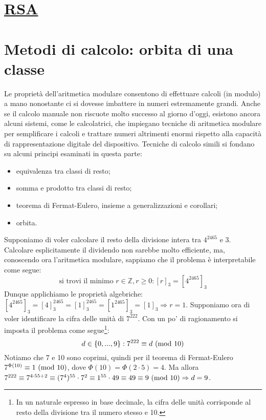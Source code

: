\section{\underline{RSA}}


\section{Metodi di calcolo: orbita di una classe}
Le proprietà dell'aritmetica modulare consentono di effettuare calcoli (in modulo)
a mano nonostante ci si dovesse imbattere in numeri estremamente grandi.
Anche se il calcolo manuale non riscuote molto successo al giorno d'oggi,
esistono ancora alcuni sistemi, come le calcolatrici, che impiegano
tecniche di aritmetica modulare per semplificare i calcoli e trattare
numeri altrimenti enormi rispetto alla capacità di rappresentazione digitale
del dispositivo.
Tecniche di calcolo simili si fondano su alcuni principi esaminati in
questa parte:
\begin{itemize}
\item equivalenza tra classi di resto;
\item somma e prodotto tra classi di resto;
\item teorema di Fermat-Eulero, insieme a generalizzazioni e corollari;
\item orbita.
\end{itemize}
Supponiamo di voler calcolare il resto della divisione intera tra
$4^{2465}$ e $3$. Calcolare esplicitamente il dividendo non sarebbe
molto efficiente, ma, conoscendo ora l'aritmetica modulare, sappiamo
che il problema è interpretabile come segue:
\[ \text{si trovi il minimo } r\in\mathbb{Z},r\geq0: [r]_3 = [4^{2465}]_3 \]
Dunque applichiamo le proprietà algebriche: $[4^{2465}]_3 = [4]^{2465}_3 = [1]_3^{2465} = [1^{2465}]_3 = [1]_3 \Rightarrow r = 1$.
Supponiamo ora di voler identificare la cifra delle unità di $7^{222}$.
Con un po' di ragionamento si imposta il problema come segue\footnote{In un naturale espresso in
base decimale, la cifra delle unità corrisponde al resto della divisione tra il numero stesso e 10.}:
\[ d\in\{0,...,9\}: 7^{222}\equiv d\ (\mathrm{mod}\ 10) \]
Notiamo che 7 e 10 sono coprimi, quindi per il teorema di Fermat-Eulero
$7^{\Phi(10)}\equiv 1 \ (\mathrm{mod}\ 10)$, dove $\Phi(10)=\Phi(2\cdot5)=4$. Ma
allora $7^{222}\equiv 7^{4\cdot55+2} \equiv (7^4)^{55}\cdot7^2\equiv 1^{55}\cdot 49 \equiv 49\equiv 9 \ (\mathrm{mod}\ 10) \Rightarrow d=9$.

